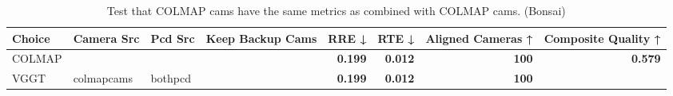 \begin{table}[H]
\caption{Test that COLMAP cams have the same metrics as combined with COLMAP cams. (Bonsai)}
\label{tab:07_combined_test_bonsai}
\begin{tabular}{lllrrrrr}
\toprule
Choice & Camera Src & Pcd Src & Keep Backup Cams & RRE ↓ & RTE ↓ & Aligned Cameras ↑ & Composite Quality ↑ \\
\midrule
COLMAP &  &  &  & \textbf{0.199} & \textbf{0.012} & \textbf{100} & \textbf{0.579} \\
VGGT & colmapcams & bothpcd &  & \textbf{0.199} & \textbf{0.012} & \textbf{100} &  \\
\bottomrule
\end{tabular}
\end{table}
